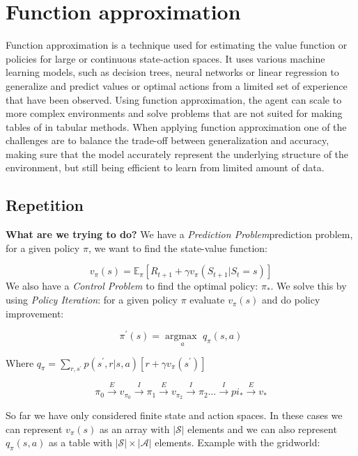 
\section{Function approximation}
Function approximation is a technique used for estimating the value function or policies for large or continuous state-action spaces. It uses various machine learning models, such as decision trees, neural networks or linear regression to generalize and predict values or optimal actions from a limited set of experience that have been observed. Using function approximation, the agent can scale to more complex environments and solve problems that are not suited for making tables of in tabular methods. When applying function approximation one of the challenges are to balance the trade-off between generalization and accuracy, making sure that the model accurately represent the underlying structure of the environment, but still being efficient to learn from limited amount of data. 

\subsection*{Repetition}
\textbf{What are we trying to do?} We have a \emph{Prediction Problem}prediction problem, for a given policy $\pi$, we want to find the state-value function:

	\begin{equation}
		v_\pi(s) = \mathbb{E}_\pi[R_{t+1} + \gamma v_\pi (S_{t+1}|S_t=s)]
	\end{equation}
We also have a \emph{Control Problem} to find the optimal policy: $\pi_*$. We solve this by using \emph{Policy Iteration}: for a given policy $\pi$ evaluate $v_\pi(s)$ and do policy improvement:

	\begin{equation}
		\pi^{\prime}(s) = \underset{a}{\arg \text{max }}q_\pi(s,a)
	\end{equation}

Where $q_\pi = \sum_{r,s^{\prime}}^{}p(s^{\prime},r|s,a) [r + \gamma v_\pi(s^{\prime})] $

	\begin{equation}
		\pi_0 \overset{E}{\rightarrow}v_{\pi_0} \overset{I}{\rightarrow} \pi_1 \overset{E}{\rightarrow} v_{\pi_2} \overset{I}{\rightarrow} \pi_2 \ldots \overset{I}{\rightarrow} pi_* \overset{E}{\rightarrow} v_*	
	\end{equation}

So far we have only considered finite state and action spaces. In these cases we can represent $v_\pi(s)$ as an array with $|\mathcal{S}|$ elements and we can also represent $q_\pi(s,a)$ as a table with $|\mathcal{S}| \times |\mathcal{A}|$ elements. Example with the gridworld:

